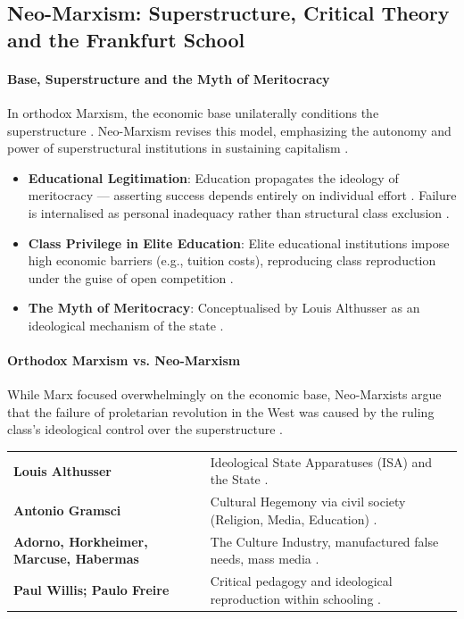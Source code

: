 \subsection{Neo-Marxism: Superstructure, Critical Theory and the Frankfurt School}

\paragraph{Base, Superstructure and the Myth of Meritocracy}
In orthodox Marxism, the economic base unilaterally conditions the superstructure . Neo-Marxism revises this model, emphasizing the autonomy and power of superstructural institutions in sustaining capitalism .

\begin{ExampleBox}
\begin{itemize}
    \item \textbf{Educational Legitimation}: Education propagates the ideology of meritocracy --- asserting success depends entirely on individual effort . Failure is internalised as personal inadequacy rather than structural class exclusion .
    \item \textbf{Class Privilege in Elite Education}: Elite educational institutions impose high economic barriers (e.g., tuition costs), reproducing class reproduction under the guise of open competition .
    \item \textbf{The Myth of Meritocracy}: Conceptualised by Louis Althusser as an ideological mechanism of the state .
\end{itemize}
\end{ExampleBox}

\paragraph{Orthodox Marxism vs. Neo-Marxism}
While Marx focused overwhelmingly on the economic base, Neo-Marxists argue that the failure of proletarian revolution in the West was caused by the ruling class's ideological control over the superstructure .

\begin{table}[htbp]
\centering
\begin{tabularx}{\textwidth}{p{4.5cm} Y}
\hline
{}
 &  \\
\hline
\textbf{Louis Althusser} & Ideological State Apparatuses (ISA) and the State . \\
\textbf{Antonio Gramsci} & Cultural Hegemony via civil society (Religion, Media, Education) . \\
\textbf{Adorno, Horkheimer, Marcuse, Habermas} & The Culture Industry, manufactured false needs, mass media . \\
\textbf{Paul Willis; Paulo Freire} & Critical pedagogy and ideological reproduction within schooling . \\
\hline
\end{tabularx}
\end{table}

